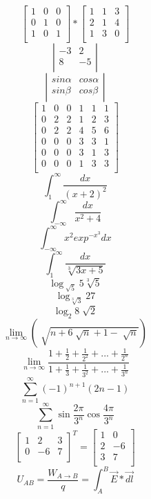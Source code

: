 \documentclass[12pt, letterpaper, titlepage]{article}
\begin{document}
$$\left[ \begin{array}{ccc}
1 & 0 & 0 \\
0 & 1 & 0 \\
1 & 0 & 1 \\
\end{array} \right] *
 \left[ \begin{array}{ccc}
1 & 1 & 3 \\
2 & 1 & 4 \\
1 & 3 & 0 \\
\end{array} \right]
$$
$$\left| \begin{array}{rr}
-3 & 2 \\
8 & -5  \\
\end{array} \right|
$$
$$\left| \begin{array}{rr}
sin \alpha & cos \alpha \\
sin \beta & cos \beta  \\
\end{array} \right|
$$
$$\left[ \begin{array}{c|cc|ccc}
1 & 0 & 0 & 1 & 1&1 \\
\hline
0 & 2 & 2 & 1 &2&3\\
0 & 2 & 2 & 4 & 5&6\\
\hline
0 & 0 & 0 & 3 & 3&1\\
0 & 0 & 0 & 3 & 1&3\\
0 & 0 & 0 & 1 & 3&3\\
\end{array} \right]
$$
$$
\int_{1}^\infty \frac{dx}{(x+2)^2}
$$
$$
\int_{- \infty}^\infty \frac{dx}{x^2+4}
$$
$$
\int_{- \infty}^\infty x^2 exp^{-x^3} dx
$$
$$
\int_{1}^\infty \frac{dx}{\sqrt[3]{3x+5}}
$$
$$ 
\log_{\sqrt[]{5}} 5 \sqrt[3]{5}
$$
$$ 
\log_{\sqrt[3]{3}} 27
$$
$$ 
\log_2 8 \sqrt[]{2}
$$
$$ 
\lim_{n \rightarrow \infty} \left( \sqrt[]{n+6 \sqrt[]{n} + 1 - \sqrt[]{n}} \right)
$$
$$ 
\lim_{n \rightarrow \infty} \frac{1+ \frac{1}{2} + \frac{1}{2^2} + ... + \frac{1}{2^n} }{1+ \frac{1}{3} + \frac{1}{3^2} + ... + \frac{1}{3^n}} 
$$
$$ 
\sum_{n=1}^{\infty} (-1)^{n+1} (2n - 1)
$$
$$ 
\sum_{n=1}^{\infty} \sin \frac{2 \pi}{3^n} \cos \frac{4 \pi}{3^n}
$$
$$\left[ \begin{array}{lll}
1 & 2 & 3 \\
0 & -6 & 7 \\
\end{array} \right]^T =
 \left[ \begin{array}{ll}
1 & 0  \\
2 & -6  \\
3 & 7  \\
\end{array} \right]
$$
$$ 
U_{AB} = \frac{W_{A \rightarrow B }}{q} = \int_{A}^B 	\vec{E} * \vec{dl}
$$
\end{document}

